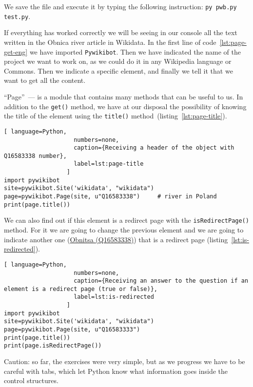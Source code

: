 We save the file and execute it by typing the following instruction: \lstinline|py pwb.py test.py|.

If everything has worked correctly we will be seeing in our console all the text written in the Obnica river article  in Wikidata. 
In the first line of code~\ref{lst:page-get-eng} we have imported \lstinline|Pywikibot|. 
Then we have indicated the name of the project we want to work on, as we could do it in any Wikipedia language or Commons. Then we indicate a specific element, and finally we tell it that we want to get all the content.


``Page''~--- is a module that contains many methods that can be useful to us. 
%
In addition to the \lstinline|get()| method, we have at our disposal the possibility of knowing the title of the element using the \lstinline|title()| method~(listing~\ref{lst:page-title}).

\begin{lstlisting}[ language=Python,
                    numbers=none,
                    caption={Receiving a header of the object with Q16583338 number},
                    label=lst:page-title
                  ]
import pywikibot
site=pywikibot.Site('wikidata', "wikidata")
page=pywikibot.Page(site, u"Q16583338")     # river in Poland
print(page.title())
\end{lstlisting}

We can also find out if this element is a redirect page with the \lstinline|isRedirectPage()| method. 
For it we are going to change the previous element and we are going to indicate another one  
(\href{https://www.wikidata.org/w/index.php?title=Q16583333&redirect=no}{Obnitsa (Q16583338)}) that is a redirect page (listing~\ref{lst:is-redirected}).

\begin{lstlisting}[ language=Python,
                    numbers=none,
                    caption={Receiving an answer to the question if an element is a redirect page (true or false)},
                    label=lst:is-redirected
                  ]
import pywikibot
site=pywikibot.Site('wikidata', "wikidata")
page=pywikibot.Page(site, u"Q16583333")
print(page.title())
print(page.isRedirectPage())
\end{lstlisting}

Caution: so far, the exercises were very simple, but as we progress we have to be careful with tabs, which let Python know what information goes inside the control structures.

